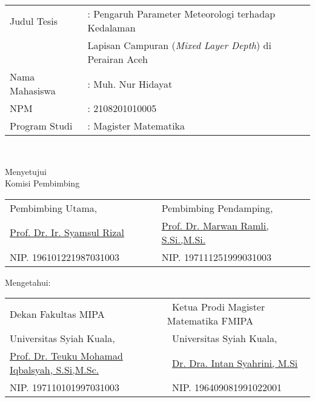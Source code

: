 \setcounter{page}{2}
\vspace{1.5pc}

\begin{center}
	\normalsize
	\noindent
	\begin{tabular}{l l l}
		Judul Tesis \verb"  " &: Pengaruh Parameter Meteorologi terhadap Kedalaman \\
		& Lapisan Campuran (\textit{Mixed Layer Depth}) di Perairan Aceh  \\
		Nama Mahasiswa &: Muh. Nur Hidayat \\
		NPM &: 2108201010005 \\
		Program Studi	&: Magister Matematika \\ 
	\end{tabular} \\
\end{center}

\begin{center}
	\vspace{4cm}
	Menyetujui\\
	Komisi Pembimbing
	
	\vspace{1cm}
	
	\begin{tabular}{l l }
		Pembimbing Utama,\verb"                 " & Pembimbing Pendamping, \verb"            "\\[2.25cm]
		\underline{Prof. Dr. Ir. Syamsul Rizal} & \underline{Prof. Dr. Marwan Ramli, S.Si.,M.Si.}\\
		NIP. 196101221987031003 & NIP. 197111251999031003
	\end{tabular}
\end{center}

\begin{center}
	\vspace{0.5cm}
	Mengetahui:\\%
	
	\vspace{1cm}
	
	\begin{tabular}{l l }
		Dekan Fakultas MIPA\verb"             " & \verb" "Ketua Prodi Magister Matematika FMIPA\\
		Universitas Syiah Kuala, & \verb" "Universitas Syiah Kuala,\\[2.25cm]
		\underline{Prof. Dr. Teuku Mohamad Iqbalsyah, S.Si,M.Sc.} & \verb" "\underline{Dr. Dra. Intan Syahrini, M.Si}\\
		NIP. 197110101997031003 & \verb" "NIP. 196409081991022001
	\end{tabular}
\end{center}
\vspace{0.3cm}
\begin{center}
	
\end{center}
\thispagestyle{empty}
